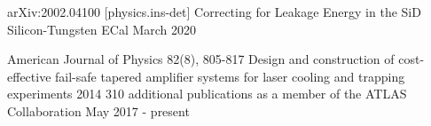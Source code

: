 
\begin{cventries}
\cventry
  {arXiv:2002.04100 [physics.ins-det]}
  {Correcting for Leakage Energy in the SiD Silicon-Tungsten ECal}
  {March 2020}
  {}
  {}

\vspace{-0.4cm}  \cventry
  {American Journal of Physics 82(8), 805-817}
  {Design and construction of cost-effective fail-safe tapered amplifier systems for laser cooling and trapping experiments}
  {2014}
  {}
  {}  
 \vspace{-0.4cm}\cventry
 {}
 {310 additional publications as a member of the ATLAS Collaboration}
 {May 2017 - present}
 {}
 {}
\end{cventries}  

